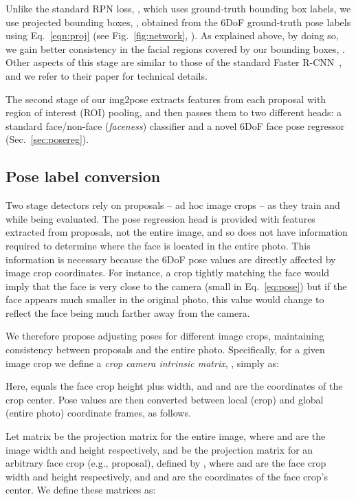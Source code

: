 \documentclass[final]{cvpr}
\begin{document}
Unlike the standard RPN loss, , which uses ground-truth bounding box labels, we use projected bounding boxes, , obtained from the 6DoF ground-truth pose labels using Eq.~\eqref{eqn:proj} (see Fig.~\ref{fig:network}, ). As explained above, by doing so, we gain better consistency in the facial regions covered by our bounding boxes, . Other aspects of this stage are similar to those of the standard Faster R-CNN~\cite{faster_rcnn}, and we refer to their paper for technical details.

The second stage of our img2pose extracts features from each proposal with region of interest (ROI) pooling, and then passes them to two different heads: a standard face/non-face ({\em faceness}) classifier and a novel 6DoF face pose regressor (Sec.~\ref{sec:posereg}). 


\subsection{Pose label conversion}
\label{sec:pose_conversion}
Two stage detectors rely on proposals -- ad hoc image crops -- as they train and while being evaluated. The pose regression head is provided with features extracted from proposals, not the entire image, and so does not have information required to determine where the face is located in the entire photo. This information is necessary because the 6DoF pose values are directly affected by image crop coordinates. For instance, a crop tightly matching the face would imply that the face is very close to the camera (small  in Eq.~\eqref{eq:pose}) but if the face appears much smaller in the original photo, this value would change to reflect the face being much farther away from the camera.   

We therefore propose adjusting poses for different image crops, maintaining consistency between proposals and the entire photo. Specifically, for a given image crop we define a {\em crop camera intrinsic matrix}, , simply as:

Here,  equals the face crop height plus width, and  and  are the  coordinates of the crop center. Pose values are then converted between local (crop) and global (entire photo) coordinate frames, as follows. 

Let matrix  be the projection matrix for the entire image, where  and  are the image width and height respectively, and  be the projection matrix for an arbitrary face crop (e.g., proposal), defined by , where  and  are the face crop width and height respectively, and  and  are the  coordinates of the face crop's center. We define these matrices as:
\end{document}
